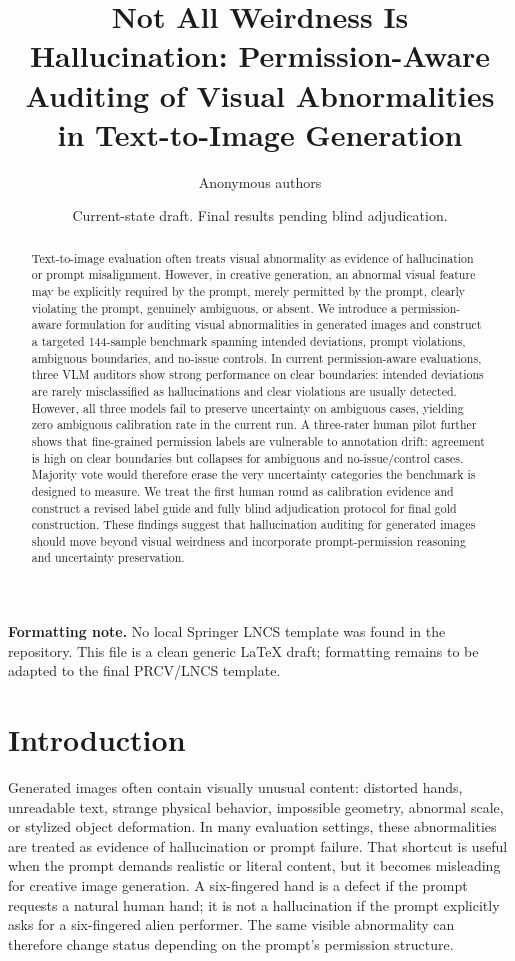 \documentclass[11pt]{article}
\title{Not All Weirdness Is Hallucination: Permission-Aware Auditing of Visual Abnormalities in Text-to-Image Generation}
\author{Anonymous authors}
\date{Current-state draft. Final results pending blind adjudication.}
\begin{document}
\maketitle

\noindent\textbf{Formatting note.} No local Springer LNCS template was found in the repository. This file is a clean generic LaTeX draft; formatting remains to be adapted to the final PRCV/LNCS template.

\begin{abstract}
Text-to-image evaluation often treats visual abnormality as evidence of hallucination or prompt misalignment. However, in creative generation, an abnormal visual feature may be explicitly required by the prompt, merely permitted by the prompt, clearly violating the prompt, genuinely ambiguous, or absent. We introduce a permission-aware formulation for auditing visual abnormalities in generated images and construct a targeted 144-sample benchmark spanning intended deviations, prompt violations, ambiguous boundaries, and no-issue controls. In current permission-aware evaluations, three VLM auditors show strong performance on clear boundaries: intended deviations are rarely misclassified as hallucinations and clear violations are usually detected. However, all three models fail to preserve uncertainty on ambiguous cases, yielding zero ambiguous calibration rate in the current run. A three-rater human pilot further shows that fine-grained permission labels are vulnerable to annotation drift: agreement is high on clear boundaries but collapses for ambiguous and no-issue/control cases. Majority vote would therefore erase the very uncertainty categories the benchmark is designed to measure. We treat the first human round as calibration evidence and construct a revised label guide and fully blind adjudication protocol for final gold construction. These findings suggest that hallucination auditing for generated images should move beyond visual weirdness and incorporate prompt-permission reasoning and uncertainty preservation.
\end{abstract}

\section{Introduction}

Generated images often contain visually unusual content: distorted hands, unreadable text, strange physical behavior, impossible geometry, abnormal scale, or stylized object deformation. In many evaluation settings, these abnormalities are treated as evidence of hallucination or prompt failure. That shortcut is useful when the prompt demands realistic or literal content, but it becomes misleading for creative image generation. A six-fingered hand is a defect if the prompt requests a natural human hand; it is not a hallucination if the prompt explicitly asks for a six-fingered alien performer. The same visible abnormality can therefore change status depending on the prompt's permission structure.
\end{document}
